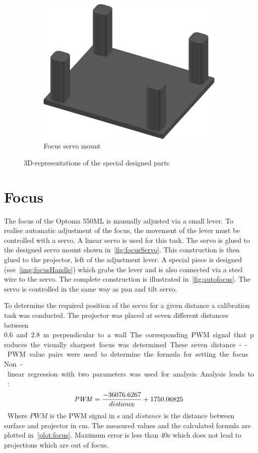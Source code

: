 \begin{figure}[htbp]
         \quad
         \begin{subfigure}[b]{0.3\textwidth}
                \includegraphics[width=\textwidth]{images/cad/servo.png}
                \caption{Focus servo mount}
                \label{fig:focusServo}
        \end{subfigure}
        \caption{3D-representations of the special designed parts}
\end{figure}

\section{Focus}

The focus of the Optoma 550ML is manually adjusted via a small lever. To realise automatic adjustment of the focus, the movement of the lever must be controlled with a servo. A linear servo is used for this task. The servo is glued to the designed servo mount shown in~\autoref{fig:focusServo}. This construction is then glued to the projector, left of the adjustment lever. A special piece is designed (see~\autoref{img:focusHandle}) which grabs the lever and is also connected via a steel wire to the servo. The complete construction is illustrated in~\autoref{fig:autofocus}. The servo is controlled in the same way as pan and tilt servo.

To determine the required position of the servo for a given distance a calibration task was conducted. The projector was placed at seven different distances between \SI{0.6} and \SI{2.8}{\meter} perpendicular to a wall. The corresponding PWM signal that produces the visually sharpest focus was determined. These seven distance--PWM value pairs were used to determine the formula for setting the focus. Non-linear regression with two parameters was used for analysis.
Analysis leads to:
\begin{equation}
\nonumber
\notag
\mathit{PWM}=\frac{-36076.6267}{distance} + 1750.06825
\end{equation}
Where $\mathit{PWM}$ is the PWM signal in \textmu s and  $distance$  is the distance between surface and projector in cm. The measured values and the calculated formula are plotted in~\autoref{plot:focus}. Maximum error is less than 40\textmu s which does not lead to projections which are out of focus.

